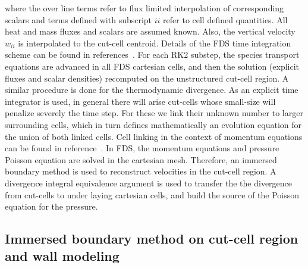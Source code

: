 \documentclass[journal,article,atmosphere,submit,moreauthors,pdftex]{Definitions/mdpi}
\begin{document}
%
where the over line terms refer to flux limited interpolation of corresponding scalars and terms defined with subscript $ii$ refer to cell defined quantities. All heat and mass fluxes and scalars are assumed known. Also, the vertical velocity $w_{ii}$ is interpolated to the cut-cell centroid. Details of the FDS time integration scheme can be found in references~\cite{mcgratta_2013,mcdermo_2014}. For each RK2 substep, the species transport equations are advanced in all FDS cartesian cells, and then the solution (explicit fluxes and scalar densities) recomputed on the unstructured cut-cell region. A similar procedure is done for the thermodynamic divergence.
As an explicit time integrator is used, in general there will arise cut-cells whose small-size will penalize severely the time step. For these we link their unknown number to larger surrounding cells, which in turn defines mathematically an evolution equation for the union of both linked cells. Cell linking in the context of momentum equations can be found in reference~\cite{kirk_2003}.
In FDS, the momentum equations and pressure Poisson equation are solved in the cartesian mesh. Therefore, an immersed boundary method is used to reconstruct velocities in the cut-cell region. A divergence integral equivalence argument is used to transfer the the divergence from cut-cells to under laying cartesian cells, and build the source of the Poisson equation for the pressure.


\subsection{Immersed boundary method on cut-cell region and wall modeling}
\end{document}
